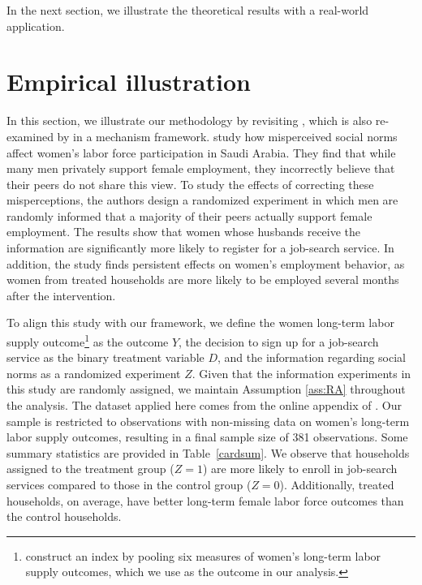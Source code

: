 \documentclass[12pt]{article}
\theoremstyle{plain}
\theoremstyle{definition}
\theoremstyle{remark}
\begin{document}
In the next section, we illustrate the theoretical results with a real-world application. 
\section{Empirical illustration}\label{sec:emp}

 

In this section, we illustrate our methodology by revisiting \cite{bursztyn2020misperceived}, which is also re-examined by \cite{kwon2024testing} in a mechanism framework. \cite{bursztyn2020misperceived} study how misperceived social norms affect women's labor force participation in Saudi Arabia. They find that while many men privately support female employment, they incorrectly believe that their peers do not share this view. To study the effects of correcting these misperceptions, the authors design a randomized experiment in which men are randomly informed that a majority of their peers actually support female employment. The results show that women whose husbands receive the information are significantly more likely to register for a job-search service. In addition, the study finds persistent effects on women's employment behavior, as women from treated households are more likely to be employed several months after the intervention.

To align this study with our framework, we define the women long-term labor supply outcome\footnote{\cite{bursztyn2020misperceived} construct an index by pooling six measures of women's long-term labor supply outcomes, which we use as the outcome in our analysis.} as the outcome $Y$, the decision to sign up for a job-search service as the binary treatment variable $D$, and the information regarding social norms as a randomized experiment $Z$. Given that the information experiments in this study are randomly assigned, we maintain Assumption \ref{ass:RA} throughout the analysis. The dataset applied here comes from the online appendix of \cite{bursztyn2020misperceived}. Our sample is restricted to observations with non-missing data on women's long-term labor supply outcomes, resulting in a final sample size of 381 observations. Some summary statistics are provided in Table~\ref{cardsum}. We observe that households assigned to the treatment group ($Z=1$) are more likely to enroll in job-search services compared to those in the control group ($Z=0$). Additionally, treated households, on average, have better long-term female labor force outcomes than the control households.
\end{document}
